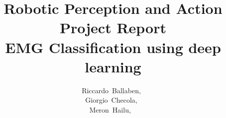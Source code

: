 \documentclass[journal]{IEEEtran}
\begin{document}
%
\title{Robotic Perception and Action Project Report \\EMG Classification using deep learning}
%
%
%

\author{Riccardo~Ballaben,~ \\ %
Giorgio~Checola,~  \\
Meron~Hailu, ~
        }%



% 
%


% 
\end{document}

